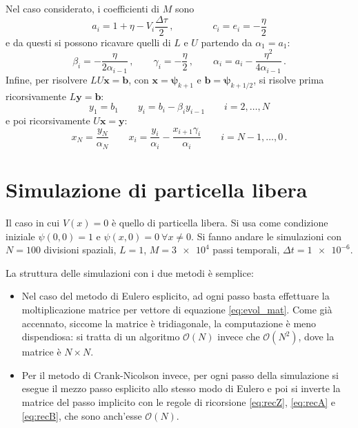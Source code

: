 \documentclass[a4paper, titlepage]{article}
\begin{document}
Nel caso considerato, i coefficienti di $M$ sono
\begin{equation*}
    a_i = 1 + \eta - V_i \frac{\Delta\tau}{2}\, , \qquad\qquad
    c_i = e_i = -\frac{\eta}{2}
\end{equation*}
e da questi si possono ricavare quelli di $L$ e $U$ partendo da $\alpha_1 = a_1$:
\begin{equation}
    \beta_i = -\frac{\eta}{2\alpha_{i-1}}\, ,
    \qquad
    \gamma_i = -\frac{\eta}{2}\, ,
    \qquad
    \alpha_i = a_i - \frac{\eta^2}{4\alpha_{i-1}}\, .
    \label{eq:recZ}
\end{equation}
Infine, per risolvere $LU\mathbf{x} = \mathbf{b}$, con $\mathbf{x} = \bm{\psi}_{k+1}$ e $\mathbf{b} = \bm{\psi}_{k+1/2}$, si risolve prima ricorsivamente $L\mathbf{y} = \mathbf{b}$:
\begin{equation}
    y_1 = b_1 \qquad y_i = b_i -\beta_i y_{i-1} \qquad i = 2,\dots,N
    \label{eq:recA}
\end{equation}
e poi ricorsivamente $U\mathbf{x} = \mathbf{y}$:
\begin{equation}
    x_N = \frac{y_N}{\alpha_N} \qquad x_i = \frac{y_i}{\alpha_i} - \frac{x_{i+1}\gamma_i}{\alpha_i} \qquad i = N-1,\dots,0\, .
    \label{eq:recB}
\end{equation}

\section{Simulazione di particella libera}
Il caso in cui $V(x) = 0$ è quello di particella libera. Si usa come condizione iniziale $\psi(0,0) = 1$ e $\psi(x,0) = 0\ \forall x \neq 0$. Si fanno andare le simulazioni con $N = 100$ divisioni spaziali, $L=1$, $M = \num{3e4}$ passi temporali, $\Delta t = \num{1e-6}$. 

La struttura delle simulazioni con i due metodi è semplice:
\begin{itemize}
    \item Nel caso del metodo di Eulero esplicito, ad ogni passo basta effettuare la moltiplicazione matrice per vettore di equazione \eqref{eq:evol_mat}. Come già accennato, siccome la matrice è tridiagonale, la computazione è meno dispendiosa: si tratta di un algoritmo $\mathcal{O}(N)$ invece che $\mathcal{O}(N^2)$, dove la matrice è $N\times N$.
    \item Per il metodo di Crank-Nicolson invece, per ogni passo della simulazione si esegue il mezzo passo esplicito allo stesso modo di Eulero e poi si inverte la matrice del passo implicito con le regole di ricorsione \eqref{eq:recZ}, \eqref{eq:recA} e \eqref{eq:recB}, che sono anch'esse $\mathcal{O}(N)$.
\end{itemize}
\end{document}
